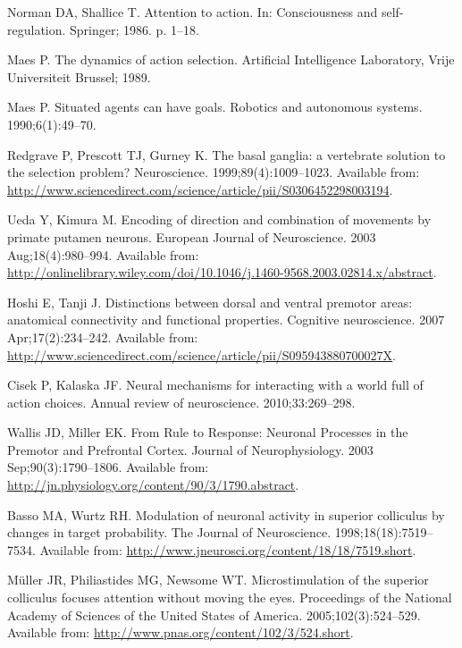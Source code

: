 \documentclass[10pt,letterpaper]{article}
\begin{document}
\begin{thebibliography}{10}
Norman DA, Shallice T.
\newblock Attention to action.
\newblock In: Consciousness and self-regulation. Springer; 1986. p. 1--18.

Maes P.
\newblock The dynamics of action selection.
\newblock Artificial Intelligence Laboratory, Vrije Universiteit Brussel; 1989.

Maes P.
\newblock Situated agents can have goals.
\newblock Robotics and autonomous systems. 1990;6(1):49--70.

Redgrave P, Prescott TJ, Gurney K.
\newblock The basal ganglia: a vertebrate solution to the selection problem?
\newblock Neuroscience. 1999;89(4):1009--1023.
\newblock Available from:
  \url{http://www.sciencedirect.com/science/article/pii/S0306452298003194}.

Ueda Y, Kimura M.
\newblock Encoding of direction and combination of movements by primate putamen
  neurons.
\newblock European Journal of Neuroscience. 2003 Aug;18(4):980--994.
\newblock Available from:
  \url{http://onlinelibrary.wiley.com/doi/10.1046/j.1460-9568.2003.02814.x/abstract}.

Hoshi E, Tanji J.
\newblock Distinctions between dorsal and ventral premotor areas: anatomical
  connectivity and functional properties.
\newblock Cognitive neuroscience. 2007 Apr;17(2):234--242.
\newblock Available from:
  \url{http://www.sciencedirect.com/science/article/pii/S095943880700027X}.

Cisek P, Kalaska JF.
\newblock Neural mechanisms for interacting with a world full of action
  choices.
\newblock Annual review of neuroscience. 2010;33:269--298.

Wallis JD, Miller EK.
\newblock From {Rule} to {Response}: {Neuronal} {Processes} in the {Premotor}
  and {Prefrontal} {Cortex}.
\newblock Journal of Neurophysiology. 2003 Sep;90(3):1790--1806.
\newblock Available from:
  \url{http://jn.physiology.org/content/90/3/1790.abstract}.

Basso MA, Wurtz RH.
\newblock Modulation of neuronal activity in superior colliculus by changes in
  target probability.
\newblock The Journal of Neuroscience. 1998;18(18):7519--7534.
\newblock Available from:
  \url{http://www.jneurosci.org/content/18/18/7519.short}.

Müller JR, Philiastides MG, Newsome WT.
\newblock Microstimulation of the superior colliculus focuses attention without
  moving the eyes.
\newblock Proceedings of the National Academy of Sciences of the United States
  of America. 2005;102(3):524--529.
\newblock Available from: \url{http://www.pnas.org/content/102/3/524.short}.


\end{thebibliography}
\end{document}

